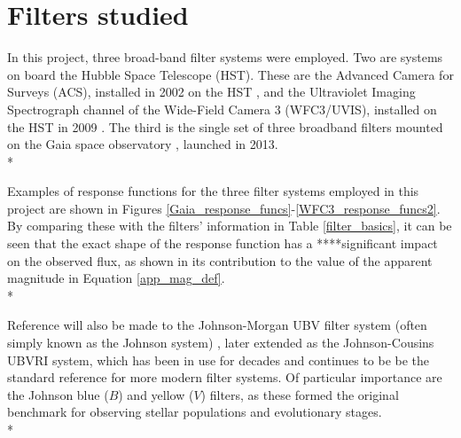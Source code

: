 \documentclass[12pt, a4paper]{report}
\begin{document}
\section{Filters studied} \label{filter_desc}
In this project, three broad-band filter systems were employed. Two are systems on board the Hubble Space Telescope (HST). These are the Advanced Camera for Surveys (ACS), installed in 2002 on the HST \citep{2007AJ....133.1658S}, and the Ultraviolet Imaging Spectrograph channel of the Wide-Field Camera 3 (WFC3/UVIS), installed on the HST in 2009 \citep{2010wfc..rept...14K,2010SPIE.7731E..0ZM}. The third is the single set of three broadband filters mounted on the Gaia space observatory \citep{2010A&A...523A..48J}, launched in 2013. \\*

Examples of response functions for the three filter systems employed in this project are shown in Figures \ref{Gaia_response_funcs}-\ref{WFC3_response_funcs2}. By comparing these with the filters' information in Table \ref{filter_basics}, it can be seen that the exact shape of the response function has a ****significant impact on the observed flux, as shown in its contribution to the value of the apparent magnitude in Equation \ref{app_mag_def}.\\*

Reference will also be made to the Johnson-Morgan UBV filter system (often simply known as the Johnson system) \citep{1953ApJ...117..313J}, later extended as the Johnson-Cousins UBVRI \citep{1990PASP..102.1181B} system, which has been in use for decades and continues to be be the standard reference for more modern filter systems. Of particular importance are the Johnson blue ($B$) and yellow ($V$) filters, as these formed the original benchmark for observing stellar populations and evolutionary stages. \\*
\end{document}

